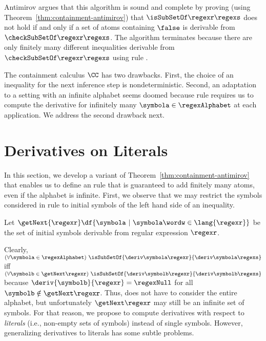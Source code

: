 Antimirov argues \cite[Theorem~8]{Antimirov1995} that this algorithm is sound and complete by proving
(using Theorem~\ref{thm:containment-antimirov})
that $\isSubSetOf\regexr\regexs$ does not hold if and only if a set of
atoms containing $\false$ is derivable from
$\checkSubSetOf\regexr\regexs$.
The algorithm terminates because there are only finitely many
different inequalities derivable from $\checkSubSetOf\regexr\regexs$
using rule . 

The containment calculus $\CC$ has two drawbacks. First, the
choice of an inequality for the next inference step is
nondeterministic. Second, an adaptation to a setting with an infinite alphabet seems
doomed because rule  requires us to compute the derivative for infinitely many
$\symbola\in\regexAlphabet$ at each application. We address the second
drawback next.



\section{Derivatives on Literals}
\label{sec:derivatives}

In this section, we develop a variant of
Theorem~\ref{thm:containment-antimirov} that enables us to define an
 rule that is guaranteed to add finitely many
atoms, even if the alphabet is infinite.
First, we observe that we may restrict the symbols considered
in rule  to initial symbols of the left hand side
of an inequality.
\begin{definition}[First]
  Let $\getNext{\regexr} \df
  \{\symbola~|~\symbola\wordw\in\lang{\regexr}\}$
  be the set of initial symbols derivable from regular expression $\regexr$.
\end{definition}
Clearly,
$(\forall\symbola\in\regexAlphabet)~\isSubSetOf{\deriv\symbola\regexr}{\deriv\symbola\regexs}$
iff
$(\forall\symbolb\in\getNext\regexr)~\isSubSetOf{\deriv\symbolb\regexr}{\deriv\symbolb\regexs}$
because $\deriv{\symbolb}{\regexr} = \regexNull$ for all
$\symbolb\notin\getNext\regexr$. Thus,  does not
have to consider the entire alphabet, but unfortunately
$\getNext\regexr$ may still be an infinite set of 
symbols. For that reason, we propose to compute derivatives with
respect to \emph{literals} (i.e., non-empty sets of symbols) instead
of single symbols. However, generalizing derivatives to literals has
some subtle problems.

